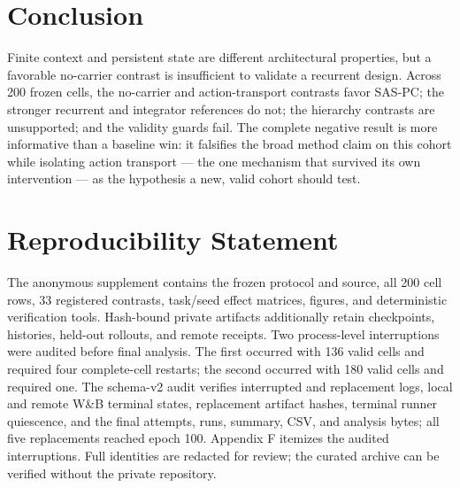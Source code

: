 \section{Conclusion}\label{conclusion}

Finite context and persistent state are different architectural
properties, but a favorable no-carrier contrast is insufficient to
validate a recurrent design. Across 200 frozen cells, the no-carrier and
action-transport contrasts favor SAS-PC; the stronger recurrent and
integrator references do not; the hierarchy contrasts are unsupported;
and the validity guards fail. The complete negative result is more
informative than a baseline win: it falsifies the broad method claim on
this cohort while isolating action transport --- the one mechanism that
survived its own intervention --- as the hypothesis a new, valid cohort
should test.

\section*{Reproducibility Statement}

\begingroup\small

The anonymous supplement contains the frozen protocol and source, all
200 cell rows, 33 registered contrasts, task/seed effect matrices,
figures, and deterministic verification tools. Hash-bound private
artifacts additionally retain checkpoints, histories, held-out rollouts,
and remote receipts. Two process-level interruptions were audited before
final analysis. The first occurred with 136 valid cells and required
four complete-cell restarts; the second occurred with 180 valid cells
and required one. The schema-v2 audit verifies interrupted and
replacement logs, local and remote W\&B terminal states, replacement
artifact hashes, terminal runner quiescence, and the final attempts,
runs, summary, CSV, and analysis bytes; all five replacements reached
epoch 100. Appendix F itemizes the audited interruptions. Full
identities are redacted for review; the curated archive can be verified
without the private repository. \endgroup
